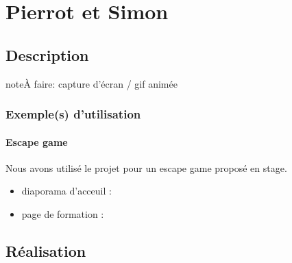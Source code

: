 \documentclass[letterpaper,10pt,french]{sphinxmanual}
\begin{document}


\section{Pierrot et Simon}
\label{\detokenize{projets/pierrot:projetpierrot}}\label{\detokenize{projets/pierrot:pierrot-et-simon}}\label{\detokenize{projets/pierrot::doc}}

\subsection{Description}
\label{\detokenize{projets/pierrot:description}}
\begin{sphinxadmonition}{note}{\label{projets/pierrot:index-0}À faire:}
capture d’écran / gif animée
\end{sphinxadmonition}


\subsubsection{Exemple(s) d’utilisation}
\label{\detokenize{projets/pierrot:exemple-s-d-utilisation}}

\paragraph{Escape game}
\label{\detokenize{projets/pierrot-exemple-escape:escape-game}}\label{\detokenize{projets/pierrot-exemple-escape::doc}}
Nous avons utilisé le projet {\hyperref[\detokenize{projets/pierrot:projetpierrot}]{}} pour un escape
game proposé en stage.
\begin{itemize}
\item {} 
diaporama d’acceuil : 

\item {} 
page de formation : 

\end{itemize}

\noindent{}


\subsection{Réalisation}
\label{\detokenize{projets/pierrot:realisation}}
\end{document}
